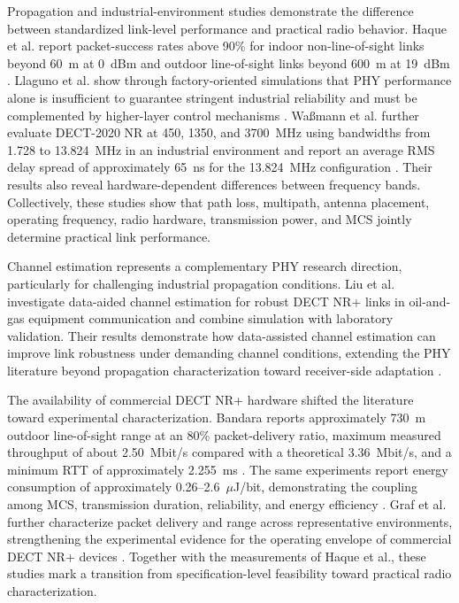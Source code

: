 Propagation and industrial-environment studies demonstrate the difference
between standardized link-level performance and practical radio behavior.
Haque et al. report packet-success rates above 90\% for indoor
non-line-of-sight links beyond 60~m at 0~dBm and outdoor line-of-sight links
beyond 600~m at 19~dBm
\cite{haqueDECT2020NRLink2025}. Llaguno et al. show through factory-oriented
simulations that PHY performance alone is insufficient to guarantee stringent
industrial reliability and must be complemented by higher-layer control
mechanisms
\cite{llagunoPhysicalLayerPerformance2024}. Wa{\ss}mann et al. further
evaluate DECT-2020 NR at 450, 1350, and 3700~MHz using bandwidths from
1.728 to 13.824~MHz in an industrial environment and report an average RMS
delay spread of approximately 65~ns for the 13.824~MHz configuration
\cite{wassmannPerformanceDECT2020NR2024}. Their results also reveal
hardware-dependent differences between frequency bands. Collectively, these
studies show that path loss, multipath, antenna placement, operating
frequency, radio hardware, transmission power, and MCS jointly determine
practical link performance.

Channel estimation represents a complementary PHY research direction,
particularly for challenging industrial propagation conditions. Liu et al.
investigate data-aided channel estimation for robust DECT NR+ links in
oil-and-gas equipment communication and combine simulation with laboratory
validation. Their results demonstrate how data-assisted channel estimation can
improve link robustness under demanding channel conditions, extending the PHY
literature beyond propagation characterization toward receiver-side adaptation
\cite{liuDataAidedChannelEstimation2025}.

The availability of commercial DECT NR+ hardware shifted the literature toward
experimental characterization. Bandara reports approximately 730~m outdoor
line-of-sight range at an 80\% packet-delivery ratio, maximum measured
throughput of about 2.50~Mbit/s compared with a theoretical 3.36~Mbit/s, and
a minimum RTT of approximately 2.255~ms
\cite{bandaraExperimentalValidationAnalysis2025}. The same experiments report
energy consumption of approximately 0.26--2.6~$\mu$J/bit, demonstrating the
coupling among MCS, transmission duration, reliability, and energy efficiency
\cite{bandaraExperimentalValidationAnalysis2025}. Graf et al. further
characterize packet delivery and range across representative environments,
strengthening the experimental evidence for the operating envelope of
commercial DECT NR+ devices
\cite{grafWhatExpectWhen2026}. Together with the measurements of Haque et al.,
these studies mark a transition from specification-level feasibility toward
practical radio characterization.

